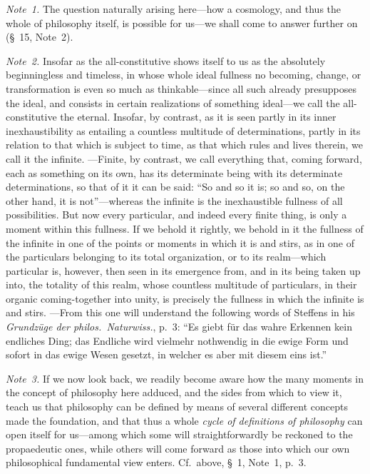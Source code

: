 \documentclass[12pt,a4paper]{book}
\begin{document}
{\small\emph{Note~1.} The question naturally arising here---how a cosmology, and thus
the whole of philosophy itself, is possible for us---we shall come to answer further
on (\S~15, Note~2).\par}

{\small\emph{Note~2.} Insofar as the all-constitutive shows itself to us as the
absolutely beginningless and timeless, in whose whole ideal fullness no becoming,
change, or transformation is even so much as thinkable---since all such already
presupposes the ideal, and consists in certain realizations of something
ideal---we call the all-constitutive the eternal. Insofar, by contrast, as it is
seen partly in its inner inexhaustibility as entailing a countless multitude of
determinations, partly in its relation to that which is subject to time, as that
which rules and lives therein, we call it the infinite. ---Finite, by contrast, we
call everything that, coming forward, each as something on its own, has its
determinate being with its determinate determinations, so that of it it can be
said: ``So and so it is; so and so, on the other hand, it is not''---whereas the
infinite is the inexhaustible fullness of all possibilities. But now every
particular, and indeed every finite thing, is only a moment within this fullness.
If we behold it rightly, we behold in it the fullness of the infinite in one of the
points or moments in which it is and stirs, as in one of the particulars belonging
to its total organization, or to its realm---which particular is, however, then
seen in its emergence from, and in its being taken up into, the totality of this
realm, whose countless multitude of particulars, in their organic coming-together
into unity, is precisely the fullness in which the infinite is and stirs. ---From
this one will understand the following words of Steffens in his \textit{Grundzüge
der philos.\ Naturwiss.}, p.~3: ``Es giebt für das wahre Erkennen kein endliches
Ding; das Endliche wird vielmehr nothwendig in die ewige Form und sofort in das
ewige Wesen gesetzt, in welcher es aber mit diesem eins ist.''\par}

{\small\emph{Note~3.} If we now look back, we readily become aware how the many
moments in the concept of philosophy here adduced, and the sides from which to view
it, teach us that philosophy can be defined by means of several different concepts
made the foundation, and that thus a whole \emph{cycle of definitions of philosophy}
can open itself for us---among which some will straightforwardly be reckoned to the
propaedeutic ones, while others will come forward as those into which our own
philosophical fundamental view enters. Cf.\ above, \S~1, Note~1, p.~3.\par}
\end{document}
